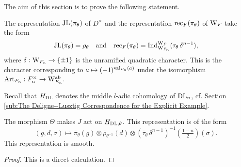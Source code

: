 \documentclass[../main.tex]{subfiles}
\begin{document}
The aim of this section is to prove the following statement.
\begin{thm}\label{thm:MainRes1}
  The representation $\mathrm{JL}(\pi_\theta)$ of $D^\times$ and the representation
  $\mathrm{rec}_F(\pi_\theta)$ of $\mathrm W_F$ take the form
  \begin{equation*}
    \mathrm{JL}(\pi_\theta) = \rho_{\theta}
    \quad \text{and} \quad \mathrm{rec}_F(\pi_\theta) = \mathrm{Ind}_{\mathrm W_{F_n}}^{\mathrm W_F} 
    (\tau_\theta \, \delta^{n-1}),
  \end{equation*}
  where $\delta: \mathrm W_{F_n} \to \{\pm 1\}$ is the unramified quadratic
  character. This is the character corresponding to $a \mapsto
  (-1)^{\mathrm{val}_{F_n}(a)}$ under the isomorphism $\mathrm{Art}_{F_n}: F_n^\times \to
  \mathrm W_{E_n}^{\mathrm{ab}}$. 
\end{thm}


Recall that $H_{\mathrm{DL}}$ denotes the middle $l$-adic cohomology of 
$\mathrm{DL}_n$, cf. Section \ref{sub:The Deligne--Lusztig Correspondence for the
Explicit Example}.
\begin{lem}
  The morphism $\Theta$ makes $J$ act on ${H}_{\mathrm{DL},\theta}$. This representation is 
  of the form 
  \begin{equation*}
    (g,d,\sigma) \mapsto \bar \pi_\theta(g) \otimes \bar \rho_{\theta^{-1}}(d)
    \otimes \left(\bar \tau_\theta \, \delta^{n-1}\right)^{-1}(\tfrac{1-n}2)(\sigma).
  \end{equation*}
  This representation is smooth.
\begin{proof}
  This is a direct calculation.
\end{proof}
\end{lem}
\end{document}
